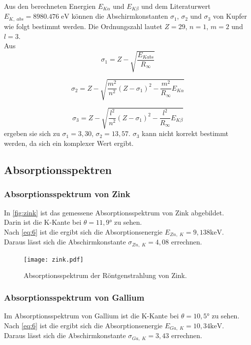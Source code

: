 \documentclass[a4paper]{scrartcl}
\begin{document}
Aus den berechneten Energien $E_{K \alpha}$ und $E_{K \beta}$ und dem Literaturwert $E_{K,\;abs} = 8980.476 \; \mathrm{eV}$ können die 
Abschirmkonstanten $\sigma_1$, $\sigma_2$ und $\sigma_3$ von Kupfer wie folgt bestimmt werden. Die Ordnungszahl lautet $Z = 29$, $n=1$, $m=2$ und $l=3$. \\
Aus 
\begin{equation*}
  \sigma_1=Z-\sqrt{\frac{E_{Kabs}}{R_\infty}}
  \label{eq:sigma}
  \end{equation*}
  
  \begin{equation*}
  \sigma_2=Z-\sqrt{ \frac{m^2}{n^2}(Z-\sigma_1)^2 - \frac{m^2}{R_\infty} E_{K\alpha}}
  \end{equation*}
  
  \begin{equation*}
      \sigma_3=Z-\sqrt{ \frac{l^2}{n^2}(Z-\sigma_1)^2 - \frac{l^2}{R_\infty} E_{K\beta}}
  \end{equation*}
ergeben sie sich zu $\sigma_1 = 3,30$, $\sigma_2 = 13,57$. 
$\sigma_3$ kann nicht korrekt bestimmt werden, da sich ein komplexer Wert ergibt.




\subsection{Absorptionsspektren}
\label{subsec:absorptionsspektrum}


\subsubsection*{Absorptionsspektrum von Zink}
In \autoref{fig:zink} ist das gemessene Absorptionsspektrum von Zink abgebildet.\\
Darin ist die K-Kante bei $\theta = 11,9°$ zu sehen. \\
Nach \autoref{eq:6} ist die ergibt sich die Absorptionsenergie $E_{Zn, \; K} = 9,138 \mathrm{ keV}$.\\
Daraus lässt sich die Abschirmkonstante $\sigma_{Zn, \; K} = 4,08$ errechnen.
\begin{figure}
  \centering
  \texttt{[image: zink.pdf]}
  \caption{Absorptionsspektrum der Röntgenstrahlung von Zink.}
  \label{fig:zink}
\end{figure}


\subsubsection*{Absorptionsspektrum von Gallium}
Im Absorptionsspektrum von Gallium ist die K-Kante bei $\theta = 10,5°$ zu sehen. \\
Nach \autoref{eq:6} ist die ergibt sich die Absorptionsenergie $E_{Ga, \; K} = 10,34 \mathrm{ keV}$.\\
Daraus lässt sich die Abschirmkonstante $\sigma_{Ga, \; K} = 3,43$ errechnen.
\end{document}
